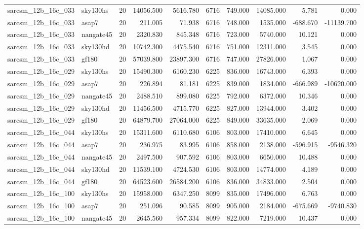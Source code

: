 \begin{longtable}{llrrrrrrrr}
sarcsm\_12b\_16c\_033 & sky130hs & 20 & 14056.500 & 5616.780 & 6716 & 749.000 & 14085.000 & 5.781 & 0.000 \\
sarcsm\_12b\_16c\_033 & asap7 & 20 & 211.005 & 71.938 & 6716 & 748.000 & 1535.000 & -688.670 & -11139.700 \\
sarcsm\_12b\_16c\_033 & nangate45 & 20 & 2320.830 & 845.348 & 6716 & 723.000 & 5740.000 & 10.121 & 0.000 \\
sarcsm\_12b\_16c\_033 & sky130hd & 20 & 10742.300 & 4475.540 & 6716 & 751.000 & 12311.000 & 3.545 & 0.000 \\
sarcsm\_12b\_16c\_033 & gf180 & 20 & 57039.800 & 23897.300 & 6716 & 747.000 & 27826.000 & 1.067 & 0.000 \\
sarcsm\_12b\_16c\_029 & sky130hs & 20 & 15490.300 & 6160.230 & 6225 & 836.000 & 16743.000 & 6.393 & 0.000 \\
sarcsm\_12b\_16c\_029 & asap7 & 20 & 226.894 & 81.181 & 6225 & 839.000 & 1834.000 & -666.989 & -10620.000 \\
sarcsm\_12b\_16c\_029 & nangate45 & 20 & 2488.510 & 899.080 & 6225 & 792.000 & 6372.000 & 10.346 & 0.000 \\
sarcsm\_12b\_16c\_029 & sky130hd & 20 & 11456.500 & 4715.770 & 6225 & 827.000 & 13944.000 & 3.402 & 0.000 \\
sarcsm\_12b\_16c\_029 & gf180 & 20 & 64879.700 & 27064.000 & 6225 & 849.000 & 33635.000 & 2.069 & 0.000 \\
sarcsm\_12b\_16c\_044 & sky130hs & 20 & 15311.600 & 6110.680 & 6106 & 803.000 & 17410.000 & 6.645 & 0.000 \\
sarcsm\_12b\_16c\_044 & asap7 & 20 & 236.975 & 83.995 & 6106 & 858.000 & 2138.000 & -596.915 & -9546.320 \\
sarcsm\_12b\_16c\_044 & nangate45 & 20 & 2497.500 & 907.592 & 6106 & 803.000 & 6650.000 & 10.488 & 0.000 \\
sarcsm\_12b\_16c\_044 & sky130hd & 20 & 11539.100 & 4724.530 & 6106 & 803.000 & 14774.000 & 4.189 & 0.000 \\
sarcsm\_12b\_16c\_044 & gf180 & 20 & 64523.600 & 26584.200 & 6106 & 836.000 & 34833.000 & 2.504 & 0.000 \\
sarcsm\_12b\_16c\_100 & sky130hs & 20 & 15958.000 & 6347.250 & 8099 & 835.000 & 17496.000 & 6.763 & 0.000 \\
sarcsm\_12b\_16c\_100 & asap7 & 20 & 251.096 & 90.585 & 8099 & 905.000 & 2184.000 & -675.669 & -9740.830 \\
sarcsm\_12b\_16c\_100 & nangate45 & 20 & 2645.560 & 957.334 & 8099 & 822.000 & 7219.000 & 10.437 & 0.000 \\

\end{longtable}
